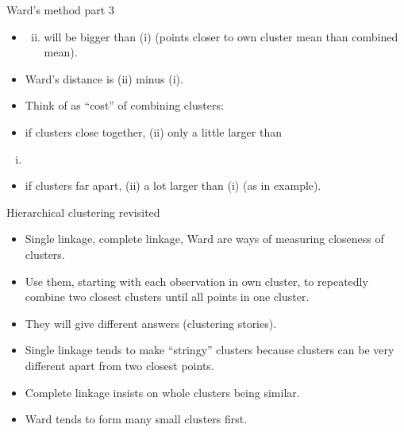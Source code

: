\documentclass[ignorenonframetext,]{beamer}
\providecommand{\tightlist}{%
  \setlength{\itemsep}{0pt}\setlength{\parskip}{0pt}}
\begin{document}
\begin{frame}{Ward's method part 3}
\protect\hypertarget{wards-method-part-3}{}

\begin{itemize}
\item
  \begin{enumerate}
  [(i)]
  \setcounter{enumi}{1}
  \tightlist
  \item
    will be bigger than (i) (points closer to own cluster mean than
    combined mean).
  \end{enumerate}
\item
  Ward's distance is (ii) minus (i).
\item
  Think of as ``cost'' of combining clusters:
\item
  if clusters close together, (ii) only a little larger than
\end{itemize}

\begin{enumerate}
[(i)]
\item
\end{enumerate}

\begin{itemize}
\tightlist
\item
  if clusters far apart, (ii) a lot larger than (i) (as in example).
\end{itemize}

\end{frame}

\begin{frame}{Hierarchical clustering revisited}
\protect\hypertarget{hierarchical-clustering-revisited}{}

\begin{itemize}
\item
  Single linkage, complete linkage, Ward are ways of measuring closeness
  of clusters.
\item
  Use them, starting with each observation in own cluster, to repeatedly
  combine two closest clusters until all points in one cluster.
\item
  They will give different answers (clustering stories).
\item
  Single linkage tends to make ``stringy'' clusters because clusters can
  be very different apart from two closest points.
\item
  Complete linkage insists on whole clusters being similar.
\item
  Ward tends to form many small clusters first.
\end{itemize}

\end{frame}
\end{document}
